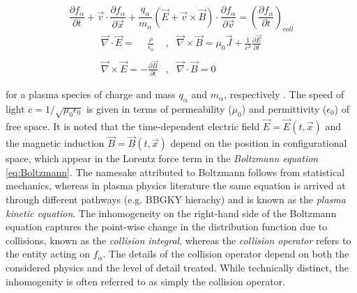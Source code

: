 \documentclass[11pt,titlepage]{report}
\begin{document}
\vspace{1em}
\\[.5em]

\begin{equation}\label{eq:Boltzmann}
\frac{\partial f_{\alpha}}{\partial t} + \vec{v}\cdot \frac{\partial f_{\alpha}}{\partial \vec{x}} + \frac{q_{\alpha}}{m_{\alpha}}\left( \vec{E} + \vec{v} \times \vec{B}\right)\cdot \frac{\partial f_{\alpha}}{\partial \vec{v}}  =  \left(\frac{\partial f_{\alpha}}{\partial t}\right)_{coll}\end{equation}
\vspace{-1em}
\begin{eqnarray}
\vec{\nabla}\cdot \vec{E} = \phantom{-}\frac{\rho}{\epsilon_0} \,\, &,& \vec{\nabla} \times \vec{B} = \mu_0\vec{J} + \frac{1}{c^2}\frac{\partial\vec{E}}{\partial t} \label{eq:Maxwell12}\\
&&\nonumber \\
\vec{\nabla}\times\vec{E} = -\frac{\partial\vec{B}}{\partial t} &,& \vec{\nabla}\cdot\vec{B} = 0 \label{eq:Maxwell34}
\end{eqnarray}

\noindent for a plasma species of charge and mass $q_{\alpha}$ and $m_{\alpha}$, respectively \label{page:defs}. The speed of light $c = 1/\sqrt{\mu_0 \epsilon_0}$ is given in terms of permeability ($\mu_0$) and permittivity ($\epsilon_0$) of free space. It is noted that the time-dependent electric field $\vec{E} = \vec{E}(t,\vec{x})$ and the magnetic induction $\vec{B} = \vec{B}(t,\vec{x})$ depend on the position in configurational space, which appear in the Lorentz force term in the \emph{Boltzmann equation} \eqref{eq:Boltzmann}. The namesake attributed to Boltzmann follows from statistical mechanics, whereas in plasma physics literature the same equation is arrived at through different pathways (e.g. BBGKY hierachy) and is known as the \emph{plasma kinetic equation}. The inhomogeneity on the right-hand side of the Boltzmann equation captures the point-wise change in the distribution function due to collisions, known as the \emph{collision integral}, whereas the \emph{collision operator} refers to the entity acting on $f_{\alpha}$. The details of the collision operator depend on both the considered physics and the level of detail treated. While technically distinct, the inhomogenity is often referred to as simply the collision operator.

\end{document}
